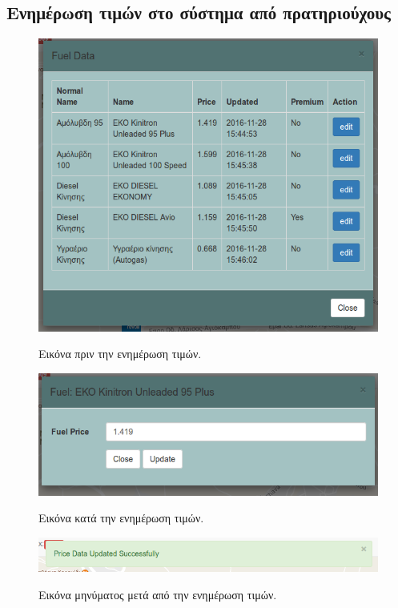 \subsection{Ενημέρωση τιμών στο σύστημα από πρατηριούχους}

\begin{figure}[H]
  \caption{Εικόνα πριν την ενημέρωση τιμών.}
  \centering
    \includegraphics[width=1\textwidth]{img/pre-edit.png}
    \label{fig:pre-edit}
\end{figure}

\begin{figure}[H]
  \caption{Εικόνα κατά την ενημέρωση τιμών.}
  \centering
    \includegraphics[width=1\textwidth]{img/pre-edit2.png}
    \label{fig:pre-edit2}
\end{figure}

\begin{figure}[H]
  \caption{Εικόνα μηνύματος μετά από την ενημέρωση τιμών.}
  \centering
    \includegraphics[width=1\textwidth]{img/msg-edit.png}
    \label{fig:msg-edit}
\end{figure}

